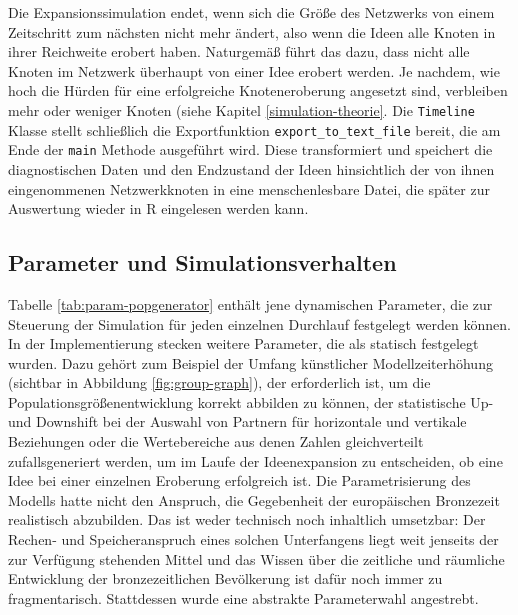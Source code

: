 \documentclass[openany,twoside,twocolumn]{book}
\begin{document}
Die Expansionssimulation endet, wenn sich die Größe des Netzwerks von einem Zeitschritt zum nächsten nicht mehr ändert, also wenn die Ideen alle Knoten in ihrer Reichweite erobert haben. Naturgemäß führt das dazu, dass nicht alle Knoten im Netzwerk überhaupt von einer Idee erobert werden. Je nachdem, wie hoch die Hürden für eine erfolgreiche Knoteneroberung angesetzt sind, verbleiben mehr oder weniger Knoten (siehe Kapitel \ref{simulation-theorie}. Die \texttt{Timeline} Klasse stellt schließlich die Exportfunktion \texttt{export\_to\_text\_file} bereit, die am Ende der \texttt{main} Methode ausgeführt wird. Diese transformiert und speichert die diagnostischen Daten und den Endzustand der Ideen hinsichtlich der von ihnen eingenommenen Netzwerkknoten in eine menschenlesbare Datei, die später zur Auswertung wieder in R eingelesen werden kann.

\hypertarget{simulation-parameters}{%
\subsection{Parameter und Simulationsverhalten}\label{simulation-parameters}}

Tabelle \ref{tab:param-popgenerator} enthält jene dynamischen Parameter, die zur Steuerung der Simulation für jeden einzelnen Durchlauf festgelegt werden können. In der Implementierung stecken weitere Parameter, die als statisch festgelegt wurden. Dazu gehört zum Beispiel der Umfang künstlicher Modellzeiterhöhung (sichtbar in Abbildung \ref{fig:group-graph}), der erforderlich ist, um die Populationsgrößenentwicklung korrekt abbilden zu können, der statistische Up- und Downshift bei der Auswahl von Partnern für horizontale und vertikale Beziehungen oder die Wertebereiche aus denen Zahlen gleichverteilt zufallsgeneriert werden, um im Laufe der Ideenexpansion zu entscheiden, ob eine Idee bei einer einzelnen Eroberung erfolgreich ist. Die Parametrisierung des Modells hatte nicht den Anspruch, die Gegebenheit der europäischen Bronzezeit realistisch abzubilden. Das ist weder technisch noch inhaltlich umsetzbar: Der Rechen- und Speicheranspruch eines solchen Unterfangens liegt weit jenseits der zur Verfügung stehenden Mittel und das Wissen über die zeitliche und räumliche Entwicklung der bronzezeitlichen Bevölkerung ist dafür noch immer zu fragmentarisch. Stattdessen wurde eine abstrakte Parameterwahl angestrebt.
\end{document}
